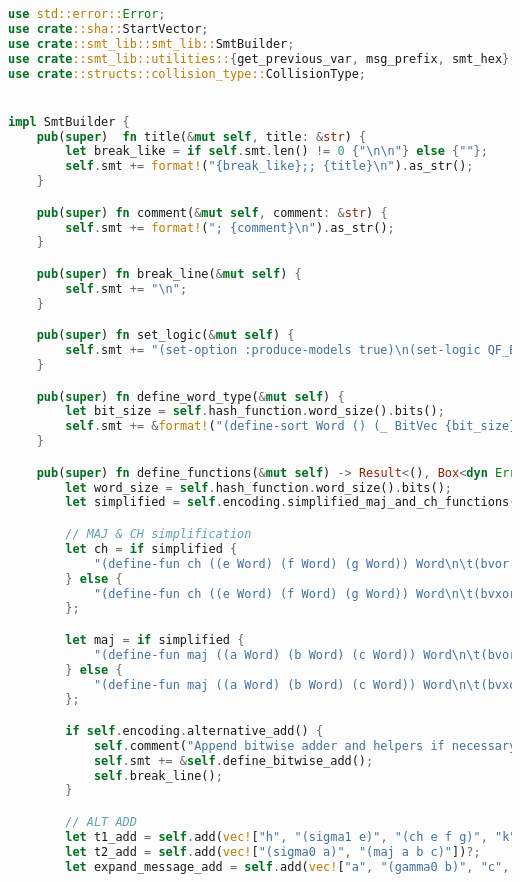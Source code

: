\begin{lstlisting}[language=rust, caption={smt\_lib/encodings/generic\_shared.rs}]
use std::error::Error;
use crate::sha::StartVector;
use crate::smt_lib::smt_lib::SmtBuilder;
use crate::smt_lib::utilities::{get_previous_var, msg_prefix, smt_hex};
use crate::structs::collision_type::CollisionType;


impl SmtBuilder {
	pub(super)  fn title(&mut self, title: &str) {
		let break_like = if self.smt.len() != 0 {"\n\n"} else {""};
		self.smt += format!("{break_like};; {title}\n").as_str();
	}

	pub(super) fn comment(&mut self, comment: &str) {
		self.smt += format!("; {comment}\n").as_str();
	}

	pub(super) fn break_line(&mut self) {
		self.smt += "\n";
	}

	pub(super) fn set_logic(&mut self) {
		self.smt += "(set-option :produce-models true)\n(set-logic QF_BV)\n";
	}

	pub(super) fn define_word_type(&mut self) {
		let bit_size = self.hash_function.word_size().bits();
		self.smt += &format!("(define-sort Word () (_ BitVec {bit_size}))\n");
	}

	pub(super) fn define_functions(&mut self) -> Result<(), Box<dyn Error>> {
		let word_size = self.hash_function.word_size().bits();
		let simplified = self.encoding.simplified_maj_and_ch_functions();

		// MAJ & CH simplification
		let ch = if simplified {
			"(define-fun ch ((e Word) (f Word) (g Word)) Word\n\t(bvor (bvand e f) (bvand (bvnot e) g))\n)"
		} else {
			"(define-fun ch ((e Word) (f Word) (g Word)) Word\n\t(bvxor (bvand e f) (bvand (bvnot e) g))\n)"
		};

		let maj = if simplified {
			"(define-fun maj ((a Word) (b Word) (c Word)) Word\n\t(bvor (bvand a b) (bvand a c) (bvand b c))\n)"
		} else {
			"(define-fun maj ((a Word) (b Word) (c Word)) Word\n\t(bvxor (bvand a b) (bvand a c) (bvand b c))\n)"
		};

		if self.encoding.alternative_add() {
			self.comment("Append bitwise adder and helpers if necessary");
			self.smt += &self.define_bitwise_add();
			self.break_line();
		}

		// ALT ADD
		let t1_add = self.add(vec!["h", "(sigma1 e)", "(ch e f g)", "k", "w"])?;
		let t2_add = self.add(vec!["(sigma0 a)", "(maj a b c)"])?;
		let expand_message_add = self.add(vec!["a", "(gamma0 b)", "c", "(gamma1 d)"])?;


\end{lstlisting}
